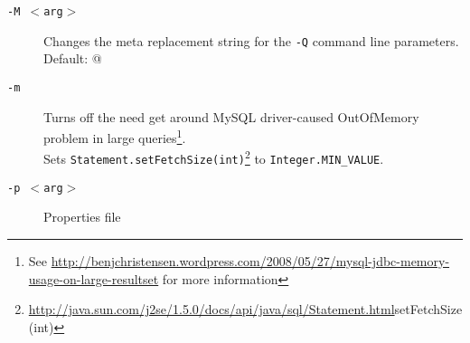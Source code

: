 \begin{description}
\item [\tt -M $<$arg$>$] Changes the meta replacement string for the {\tt -Q}
 command line parameters. Default: {\tt }@ 


\item [\tt -m]        Turns off the need get around MySQL driver-caused
  OutOfMemory problem in large
  queries\footnote{See
    \url{http://benjchristensen.wordpress.com/2008/05/27/mysql-jdbc-memory-usage-on-large-resultset} for more information}.\\ 
  Sets
  {\tt Statement.setFetchSize(int)}\footnote{\url{http://java.sun.com/j2se/1.5.0/docs/api/java/sql/Statement.html}{setFetchSize(int)}} 
  to {\tt Integer.MIN\_VALUE}.


\item[\tt -p $<$arg$>$] Properties file




\end{description}